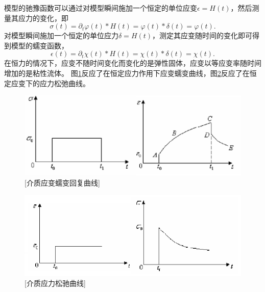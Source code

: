 模型的驰豫函数可以通过对模型瞬间施加一个恒定的单位应变$\epsilon=H(t)$，然后测量其应力的变化，即
\begin{equation}
	\sigma(t)=\partial_t\varphi(t)*H(t)=\varphi(t)*\delta(t)=\varphi(t).
\end{equation}
对模型瞬间施加一个恒定的单位应力$\delta=H(t)$，测定其应变随时间的变化即可得到模型的蠕变函数，
\begin{equation}
	\epsilon(t)=\partial_t\chi(t)*H(t)=\chi(t)*\delta(t)=\chi(t).
\end{equation}
在恒力的情况下，应变不随时间变化而变化的是弹性固体，应变以等应变率随时间增加的是粘性流体。
图\ref{fig:strain}反应了在恒定应力作用下应变蠕变曲线，图\ref{fig:stress}反应了在恒定应变下的应力松弛曲线。
\begin{figure}[!htbp]
	    \centering
		\includegraphics[width=0.9\linewidth]{figure/strain}
	    [介质应变蠕变回复曲线]
		\label{fig:strain}
\end{figure}
\begin{figure}[!htbp]
	    \centering
		\includegraphics[width=0.95\linewidth]{figure/stress}
	    [介质应力松驰曲线]
		\label{fig:stress}
\end{figure}


\vspace{0.2cm}
